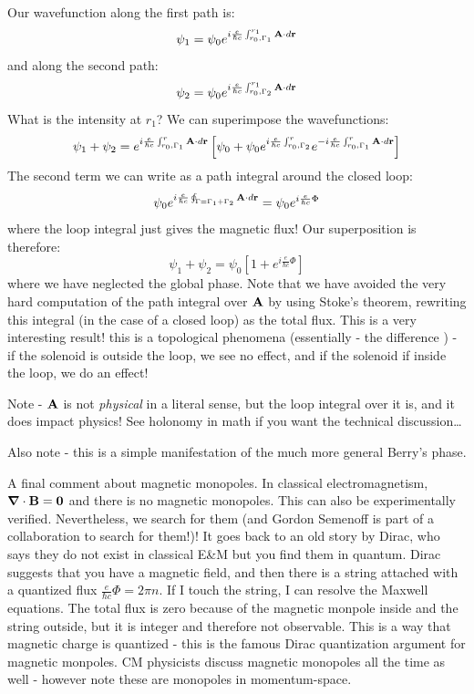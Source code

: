 Our wavefunction along the first path is:
\begin{equation}
    \psi_1 = \psi_0 e^{i\frac{e}{\hbar c}\int_{r_0, \Gamma_1}^{r_1}\mathbf{A} \cdot d\mathbf{r}}
\end{equation}
and along the second path:
\begin{equation}
    \psi_2 = \psi_0 e^{i\frac{e}{\hbar c}\int_{r_0, \Gamma_2}^{r_1} \mathbf{A} \cdot d\mathbf{r}}
\end{equation}
What is the intensity at $r_1$? We can superimpose the wavefunctions:
\begin{equation}
    \psi_1 + \psi_2 = e^{i\frac{e}{\hbar c}\int_{r_0, \Gamma_1}^r \mathbf{A} \cdot d\mathbf{r}}\left[\psi_0 + \psi_0e^{i\frac{e}{\hbar c}\int_{r_0, \Gamma_2}^r}e^{-i\frac{e}{\hbar c}\int_{r_0, \Gamma_1}^r \mathbf{A} \cdot d\mathbf{r}}\right]
\end{equation}
The second term we can write as a path integral around the closed loop:
\begin{equation}
    \psi_0 e^{i\frac{e}{\hbar c}\oint_{\Gamma = \Gamma_1 + \Gamma_2}\mathbf{A} \cdot d\mathbf{r}} = \psi_0 e^{i\frac{e}{\hbar c}\Phi}
\end{equation}
where the loop integral just gives the magnetic flux! Our superposition is therefore:
\begin{equation}
    \psi_1 + \psi_2 = \psi_0\left[1 + e^{i\frac{e}{\hbar c}\Phi}\right]
\end{equation}
where we have neglected the global phase. Note that we have avoided the very hard computation of the path integral over $\mathbf{A}$ by using Stoke's theorem, rewriting this integral (in the case of a closed loop) as the total flux. This is a very interesting result! this is a topological phenomena (essentially - the difference ) - if the solenoid is outside the loop, we see no effect, and if the solenoid if inside the loop, we do an effect!

Note - $\mathbf{A}$ is not \emph{physical} in a literal sense, but the loop integral over it is, and it does impact physics! See holonomy in math if you want the technical discussion\dots

Also note - this is a simple manifestation of the much more general Berry's phase.

A final comment about magnetic monopoles. In classical electromagnetism, $\nabla \cdot \v{B} = \v{0}$ and there is no magnetic monopoles. This can also be experimentally verified. Nevertheless, we search for them (and Gordon Semenoff is part of a collaboration to search for them!)! It goes back to an old story by Dirac, who says they do not exist in classical E\&M but you find them in quantum. Dirac suggests that you have a magnetic field, and then there is a string attached with a quantized flux $\frac{e}{\hbar c}\Phi = 2\pi n$. If I touch the string, I can resolve the Maxwell equations. The total flux is zero because of the magnetic monpole inside and the string outside, but it is integer and therefore not observable. This is a way that magnetic charge is quantized - this is the famous Dirac quantization argument for magnetic monpoles. CM physicists discuss magnetic monopoles all the time as well - however note these are monopoles in momentum-space.

